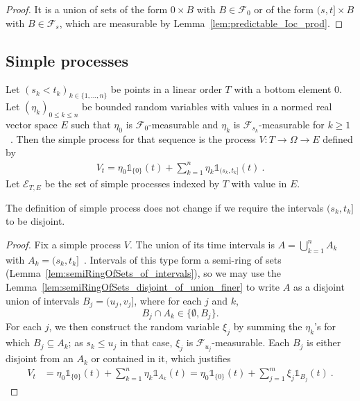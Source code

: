 \begin{proof}
  \leanok
It is a union of sets of the form ${0} \times B$ with $B \in \mathcal{F}_0$ or of the form $(s, t] \times B$ with $B \in \mathcal{F}_s$, which are measurable by Lemma~\ref{lem:predictable_Ioc_prod}.
\end{proof}

\subsection{Simple processes}

\begin{definition}\label{def:simpleProcess}
  \leanok
Let $(s_k < t_k)_{k \in \{1, ..., n\}}$ be points in a linear order $T$ with a bottom element 0.
Let $(\eta_k)_{0 \le k \le n}$ be bounded random variables with values in a normed real vector space $E$ such that $\eta_0$ is $\mathcal{F}_0$-measurable and $\eta_k$ is $\mathcal{F}_{s_k}$-measurable for $k \ge 1$~.
Then the simple process for that sequence is the process $V : T \to \Omega \to E$ defined by
\begin{align*}
  V_t = \eta_0 \mathbb{1}_{\{0\}}(t) + \sum_{k=1}^{n} \eta_k \mathbb{1}_{(s_k, t_k]}(t)
  \: .
\end{align*}
Let $\mathcal{E}_{T, E}$ be the set of simple processes indexed by $T$ with value in $E$.
\end{definition}

\begin{lemma}\label{lem:simpleProcess_admitsDisjointIntervals}
  The definition of simple process does not change if we require the intervals $(s_k, t_k]$ to be disjoint.
\end{lemma}

\begin{proof}
  Fix a simple process $V$.
  The union of its time intervals is $A=\bigcup_{k=1}^n A_k$ with $A_k = (s_k, t_k]$~.
  Intervals of this type form a semi-ring of sets
  (Lemma~\ref{lem:semiRingOfSets_of_intervals}),
  so we may use the Lemma~\ref{lem:semiRingOfSets_disjoint_of_union_finer}
  to write $A$ as a disjoint union of intervals $B_j=(u_j, v_j]$,
  where for each $j$ and $k$,
  \[
  B_j \cap A_k \in \{\emptyset, B_j\}.
    \]
  For each $j$, we then construct the random variable $\xi_j$
  by summing the $\eta_k$'s for which $B_j \subseteq A_k$;
  as $s_k\le u_j$ in that case, $\xi_j$ is $\mathcal{F}_{u_j}$-measurable.
  Each $B_j$ is either disjoint from an $A_k$ or contained in it, which justifies
  \begin{align*}
    V_t
    &= \eta_0 \mathbb{1}_{\{0\}}(t) + \sum_{k=1}^{n} \eta_k \mathbb{1}_{A_k}(t)
    = \eta_0 \mathbb{1}_{\{0\}}(t) + \sum_{j=1}^{m} \xi_j \mathbb{1}_{B_j}(t)
    \: .
  \end{align*}
\end{proof}

